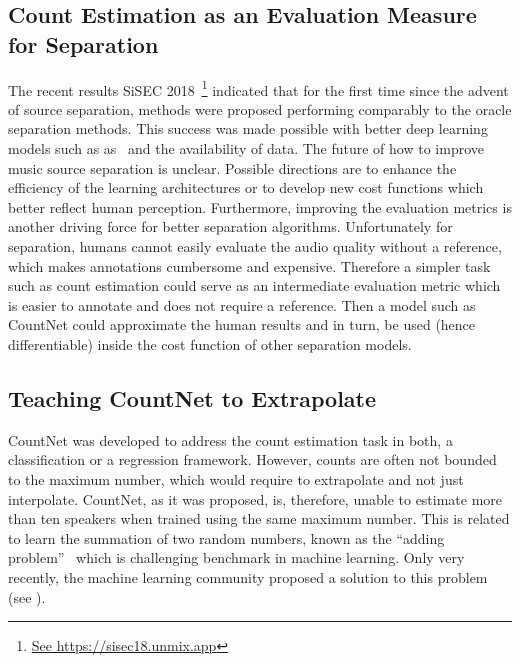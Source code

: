\subsection*{Count Estimation as an Evaluation Measure for Separation}

The recent results SiSEC 2018~\cite{stoeter18sisec}\footnote{\url{See https://sisec18.unmix.app}} indicated that for the first time since the advent of source separation, methods were proposed performing comparably to the oracle separation methods.
This success was made possible with better deep learning models such as as~\cite{takahashi17} and the availability of data. 
The future of how to improve music source separation is unclear. Possible directions are to enhance the efficiency of the learning architectures or to develop new cost functions which better reflect human perception.
Furthermore, improving the evaluation metrics is another driving force for better separation algorithms. Unfortunately for separation, humans cannot easily evaluate the audio quality without a reference, which makes annotations cumbersome and expensive. 
Therefore a simpler task such as count estimation could serve as an intermediate evaluation metric which is easier to annotate and does not require a reference. Then a model such as CountNet could approximate the human results and in turn, be used (hence differentiable) inside the cost function of other separation models.

\subsection*{Teaching CountNet to Extrapolate}

CountNet was developed to address the count estimation task in both, a classification or a regression framework. 
However, counts are often not bounded to the maximum number, which would require to extrapolate and not just interpolate.
CountNet, as it was proposed, is, therefore, unable to estimate more than ten speakers when trained using the same maximum number. 
This is related to learn the summation of two random numbers, known as the ``adding problem''~\cite{Hochreiter97} which is challenging benchmark in machine learning. 
Only very recently, the machine learning community proposed a solution to this problem (see \cite{trask18}).


